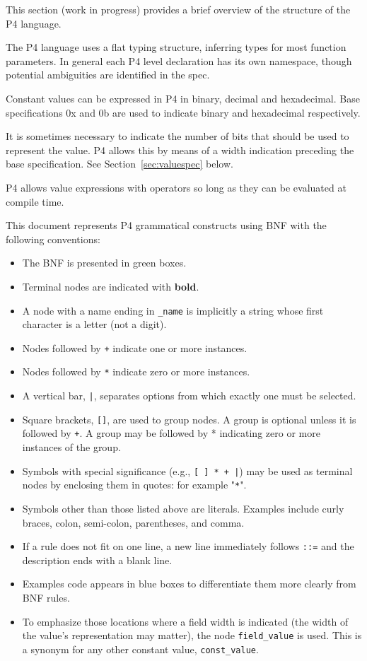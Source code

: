 \documentclass[12pt]{article}
\begin{document}
This section (work in progress) provides a brief overview of the structure 
of the P4 language. 

The P4 language uses a flat typing structure, inferring types for most function 
parameters. In general each P4 level declaration has its own namespace, though 
potential ambiguities are identified in the spec.

Constant values can be expressed in P4 in binary, decimal and hexadecimal.
Base specifications 0x and 0b are used to indicate binary and hexadecimal
respectively. 

It is sometimes necessary to indicate the number of bits that should be used 
to represent the value.  P4 allows this by means of a width indication preceding 
the base specification. See Section~\ref{sec:valuespec} below.

P4 allows value expressions with operators so long as they can be evaluated 
at compile time.


This document represents P4 grammatical constructs using BNF with the
following conventions:

\begin{itemize}
\item
The BNF is presented in green boxes.
\item
Terminal nodes are indicated with \textbf{bold}.
\item
A node with a name ending in \texttt{_name} is implicitly a string whose first character 
is a letter (not a digit).
\item
Nodes followed by \texttt{+} indicate one or more instances.
\item
Nodes followed by \texttt{*} indicate zero or more instances.
\item
A vertical bar, \texttt{|}, separates options from which exactly one must be selected.
\item
Square brackets, \texttt{[]}, are used to group nodes. A group is optional unless 
it is followed by \texttt{+}. A group may be followed by * indicating zero or more 
instances of the group.
\item
Symbols with special significance (e.g., \texttt{[ ] * + |}) may be used as terminal 
nodes by enclosing them in quotes: for example "\texttt{*}".
\item
Symbols other than those listed above are literals. Examples include curly 
braces, colon, semi-colon, parentheses, and comma.
\item
If a rule does not fit on one line, a new line immediately follows \texttt{::=} and 
the description ends with a blank line.
\item
Examples code appears in blue boxes to differentiate them more clearly
from BNF rules.
\item
To emphasize those locations where a field width is indicated (the width of 
the value's representation may matter), the node \texttt{field_value} is used. This 
is a synonym for any other constant value, \texttt{const_value}.
\end{itemize}
\end{document}
